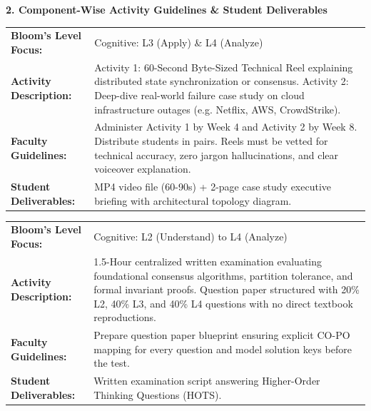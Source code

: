 \documentclass[10pt,a4paper]{article}
\begin{document}
\vspace{6pt}
{\large\textbf{\color{nbaNavy}2. Component-Wise Activity Guidelines \& Student Deliverables}}

\vspace{4pt}
\begin{table}[h!]
\centering
\small
\begin{tabularx}{\textwidth}{L{3.2cm} Y}
\toprule
{}
 \\
\midrule
\textbf{Bloom's Level Focus:} & Cognitive: L3 (Apply) \& L4 (Analyze) \\
\textbf{Activity Description:} & Activity 1: 60-Second Byte-Sized Technical Reel explaining distributed state synchronization or consensus.
Activity 2: Deep-dive real-world failure case study on cloud infrastructure outages (e.g. Netflix, AWS, CrowdStrike). \\
\textbf{Faculty Guidelines:} & Administer Activity 1 by Week 4 and Activity 2 by Week 8. Distribute students in pairs. Reels must be vetted for technical accuracy, zero jargon hallucinations, and clear voiceover explanation. \\
\textbf{Student Deliverables:} & MP4 video file (60-90s) + 2-page case study executive briefing with architectural topology diagram. \\
\bottomrule
\end{tabularx}
\end{table}
\vspace{4pt}
\begin{table}[h!]
\centering
\small
\begin{tabularx}{\textwidth}{L{3.2cm} Y}
\toprule
{}
 \\
\midrule
\textbf{Bloom's Level Focus:} & Cognitive: L2 (Understand) to L4 (Analyze) \\
\textbf{Activity Description:} & 1.5-Hour centralized written examination evaluating foundational consensus algorithms, partition tolerance, and formal invariant proofs. Question paper structured with 20\% L2, 40\% L3, and 40\% L4 questions with no direct textbook reproductions. \\
\textbf{Faculty Guidelines:} & Prepare question paper blueprint ensuring explicit CO-PO mapping for every question and model solution keys before the test. \\
\textbf{Student Deliverables:} & Written examination script answering Higher-Order Thinking Questions (HOTS). \\
\bottomrule
\end{tabularx}
\end{table}
\end{document}
